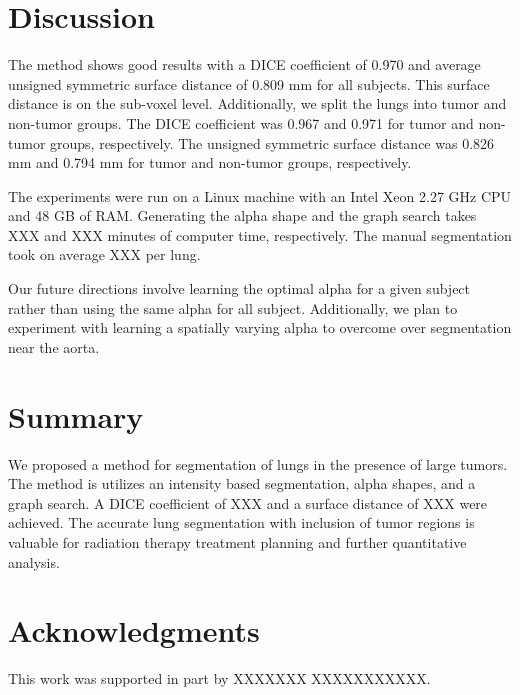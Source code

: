 \documentclass{llncs}
\begin{document}
%
\section{Discussion}
%

The method shows good results with a DICE coefficient of 0.970 and average unsigned symmetric surface distance of 0.809 mm for all subjects. This surface distance is on the sub-voxel level. Additionally, we split the lungs into tumor and non-tumor groups. The DICE coefficient was 0.967 and 0.971 for tumor and non-tumor groups, respectively. The unsigned symmetric surface distance was 0.826 mm and 0.794 mm for tumor and non-tumor groups, respectively.

The experiments were run on a Linux machine with an Intel Xeon 2.27 GHz CPU and 48 GB of RAM. Generating the alpha shape and the graph search takes XXX and XXX minutes of computer time, respectively. The manual segmentation took on average XXX per lung.

Our future directions involve learning the optimal alpha for a given subject rather than using the same alpha for all subject. Additionally, we plan to experiment with learning a spatially varying alpha to overcome over segmentation near the aorta.
%
\section{Summary}
%
We proposed a method for segmentation of lungs in the presence of large tumors. The method is utilizes an intensity based segmentation, alpha shapes, and a graph search. A DICE coefficient of XXX and a surface distance of XXX were achieved. The accurate lung segmentation with  inclusion of tumor regions is valuable for radiation therapy treatment planning and further quantitative analysis.
%
\section{Acknowledgments}
%
This work was supported in part by 
XXXXXXX XXXXXXXXXXX.


%
%









\clearpage
{} %
\renewcommand{\indexname}{Author Index}
\printindex
\clearpage

\end{document}
